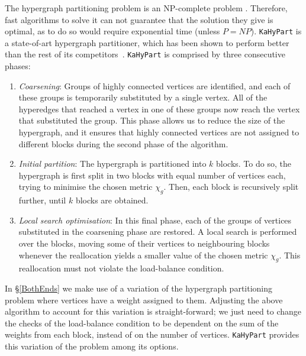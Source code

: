 The hypergraph partitioning problem is an NP-complete problem \citep{NP-complete}. Therefore, fast algorithms to solve it can not guarantee that the solution they give is optimal, as to do so would require exponential time (unless \(P = NP\)). \texttt{KaHyPart} is a state-of-art hypergraph partitioner, which has been shown to perform better than the rest of its competitors~\citep{KaHyPart}. \texttt{KaHyPart} is comprised by three consecutive phases:

\begin{enumerate}
  \item \textit{Coarsening}: Groups of highly connected vertices are identified, and each of these groups is temporarily substituted by a single vertex. All of the hyperedges that reached a vertex in one of these groups now reach the vertex that substituted the group. This phase allows us to reduce the size of the hypergraph, and it ensures that highly connected vertices are not assigned to different blocks during the second phase of the algorithm.
  \item \textit{Initial partition}: The hypergraph is partitioned into \(k\) blocks. To do so, the hypergraph is first split in two blocks with equal number of vertices each, trying to minimise the chosen metric \(\chi_g\). Then, each block is recursively split further, until \(k\) blocks are obtained.
  \item \textit{Local search optimisation}: In this final phase, each of the groups of vertices substituted in the coarsening phase are restored. A local search is performed over the blocks, moving some of their vertices to neighbouring blocks whenever the reallocation yields a smaller value of the chosen metric \(\chi_g\). This reallocation must not violate the load-balance condition.
\end{enumerate}

In \S\ref{BothEnds} we make use of a variation of the hypergraph partitioning problem where vertices have a weight assigned to them. Adjusting the above algorithm to account for this variation is straight-forward; we just need to change the checks of the load-balance condition to be dependent on the sum of the weights from each block, instead of on the number of vertices. \texttt{KaHyPart} provides this variation of the problem among its options.
